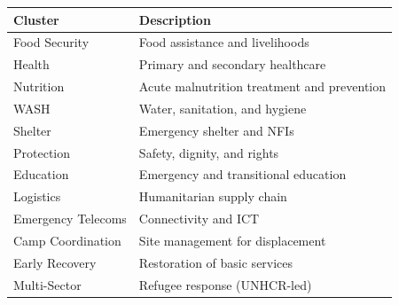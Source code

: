 \documentclass[11pt,a4paper]{article}
\begin{document}
\begin{center}
  \begin{tabular}{ll}
    \toprule
    Cluster            & Description                                 \\
    \midrule
    Food Security      & Food assistance and livelihoods             \\
    Health             & Primary and secondary healthcare            \\
    Nutrition          & Acute malnutrition treatment and prevention \\
    WASH               & Water, sanitation, and hygiene              \\
    Shelter            & Emergency shelter and NFIs                  \\
    Protection         & Safety, dignity, and rights                 \\
    Education          & Emergency and transitional education        \\
    Logistics          & Humanitarian supply chain                   \\
    Emergency Telecoms & Connectivity and ICT                        \\
    Camp Coordination  & Site management for displacement            \\
    Early Recovery     & Restoration of basic services               \\
    Multi-Sector       & Refugee response (UNHCR-led)                \\
    \bottomrule
  \end{tabular}
\end{center}
\end{document}
